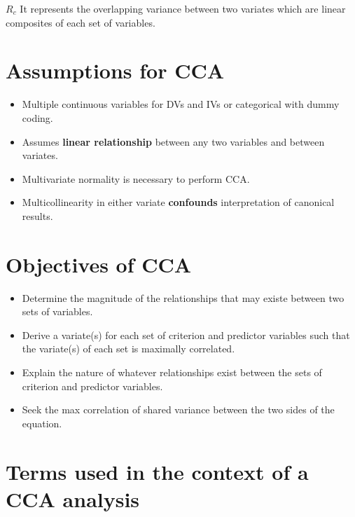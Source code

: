 \documentclass[]{book}
\providecommand{\tightlist}{%
  \setlength{\itemsep}{0pt}\setlength{\parskip}{0pt}}
\begin{document}
\textbf{\(R_c\)} It represents the overlapping variance between two
variates which are linear composites of each set of variables.

\section{Assumptions for CCA}\label{assumptions-for-cca}

\begin{itemize}
\tightlist
\item
  Multiple continuous variables for DVs and IVs or categorical with
  dummy coding.
\item
  Assumes \textbf{linear relationship} between any two variables and
  between variates.
\item
  Multivariate normality is necessary to perform CCA.
\item
  Multicollinearity in either variate \textbf{confounds} interpretation
  of canonical results.
\end{itemize}

\section{Objectives of CCA}\label{objectives-of-cca}

\begin{itemize}
\tightlist
\item
  Determine the magnitude of the relationships that may existe between
  two sets of variables.
\item
  Derive a variate(s) for each set of criterion and predictor variables
  such that the variate(s) of each set is maximally correlated.
\item
  Explain the nature of whatever relationships exist between the sets of
  criterion and predictor variables.
\item
  Seek the max correlation of shared variance between the two sides of
  the equation.
\end{itemize}

\section{Terms used in the context of a CCA
analysis}\label{terms-used-in-the-context-of-a-cca-analysis}
\end{document}
